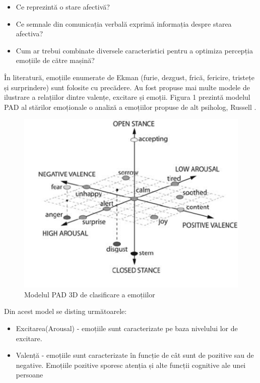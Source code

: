 \documentclass[9pt,shortpaper,twoside,web]{ieeecolor}
\begin{document}
\begin{itemize}
\item Ce reprezintă o stare afectivă?

\item Ce semnale din comunicația verbală exprimă informația despre starea afectiva?

\item Cum ar trebui combinate diversele caracteristici pentru a optimiza percepția emoțiile de către mașină?
\end{itemize}


În literatură, emoțiile enumerate de Ekman (furie, dezgust, frică, fericire, tristețe și surprindere) sunt folosite cu precădere. Au fost propuse mai multe modele de ilustrare a relațiilor dintre valențe, excitare și emoții. Figura 1 prezintă modelul PAD al stărilor emoționale o analiză a emoțiilor propuse de alt psiholog, Russell \cite{b5}.

\begin{figure}[htb]
\includegraphics[width=0.9\columnwidth]{res/fig/pad-model-3D}
\caption{Modelul PAD 3D de clasificare a emoțiilor \cite{b7}}
\label{fig1}
\end{figure}

Din acest model se disting următoarele:

\begin{itemize}
\item Excitarea(Arousal) - emoțiile sunt caracterizate pe baza nivelului lor de excitare. 

\item Valență - emoțiile sunt caracterizate în funcție de cât sunt de pozitive sau de negative. Emoțiile pozitive sporesc atenția și alte funcții cognitive ale unei persoane
\end{itemize}
\end{document}
